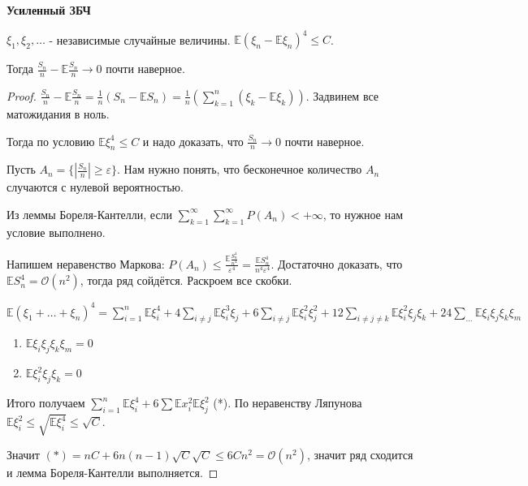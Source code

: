 \begin{theorem}
    \textbf{Усиленный ЗБЧ}

    $\xi_1, \xi_2, \ldots$ - независимые случайные величины.
    $\mathbb{E} (\xi_n - \mathbb{E}\xi_n)^4 \leqslant C$.

    Тогда $\frac{S_n}{n} - \mathbb{E} \frac{S_n}{n} \rightarrow 0$ почти наверное.
\end{theorem}

\begin{proof}
    $\frac{S_n}{n} - \mathbb{E}\frac{S_n}{n} = \frac{1}{n} (S_n - \mathbb{E}S_n) = \frac{1}{n}(\sum_{k = 1}^n (\xi_k - \mathbb{E}\xi_k))$. Задвинем все
    матожидания в ноль.

    Тогда по условию $\mathbb{E} \xi_n^4 \leqslant C$ и надо доказать, что $\frac{S_n}{n} \rightarrow 0$ почти наверное.

    Пусть $A_n = \{ \left | \frac{S_n}{n} \right | \geqslant \varepsilon \}$. Нам нужно понять, что бесконечное количество $A_n$ случаются
    с нулевой вероятностью.

    Из леммы Бореля-Кантелли, если $\sum_{k = 1}^{\infty} \sum_{k = 1}^{\infty} P(A_n) < +\infty$, то нужное нам условие выполнено.

    Напишем неравенство Маркова: $P(A_n) \leqslant \frac{\mathbb{E} \frac{S_n^4}{n^4}}{\varepsilon^4} = \frac{\mathbb{E}S_n^4}{n^4\varepsilon^4}$. Достаточно доказать, что
    $\mathbb{E}S_n^4 = \mathcal{O}(n^2)$, тогда ряд сойдётся. Раскроем все скобки.

    $\mathbb{E}(\xi_1 + \ldots + \xi_n)^4 = \sum_{i = 1}^n \mathbb{E}\xi_i^4 + 4\sum_{i \neq j}\mathbb{E}\xi_i^3\xi_j +
     6\sum_{i \neq j}\mathbb{E}\xi_i^2 \xi_j^2 + 12\sum_{i \neq j \neq k} \mathbb{E} \xi_i^2 \xi_j \xi_k + 24\sum_{\ldots} \mathbb{E}\xi_i \xi_j \xi_k \xi_m$

    \begin{enumerate}
        \item {
            $\mathbb{E}\xi_i \xi_j \xi_k \xi_m = 0$
        }
        \item {
            $\mathbb{E} \xi_i^2 \xi_j \xi_k = 0$
        }
    \end{enumerate}

    Итого получаем $\sum_{i = 1}^n \mathbb{E}\xi_i^4 + 6 \sum \mathbb{E}x_i^2 \mathbb{E}\xi_j^2$ (*). По неравенству Ляпунова
    $\mathbb{E}\xi_i^2 \leqslant \sqrt{\mathbb{E}\xi_i^4} \leqslant \sqrt{C}$.

    Значит $(*) = nC + 6n(n-1)\sqrt{C}\sqrt{C} \leqslant 6Cn^2 = \mathcal{O}(n^2)$, значит ряд сходится и лемма Бореля-Кантелли выполняется.
\end{proof}

